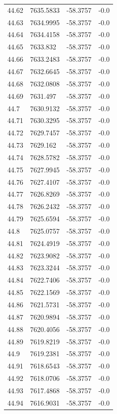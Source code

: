\begin{table}[H]
\begin{tabular}{llll}
44.62 & 7635.5833 & -58.3757 & -0.0 \\
44.63 & 7634.9995 & -58.3757 & -0.0 \\
44.64 & 7634.4158 & -58.3757 & -0.0 \\
44.65 & 7633.832 & -58.3757 & -0.0 \\
44.66 & 7633.2483 & -58.3757 & -0.0 \\
44.67 & 7632.6645 & -58.3757 & -0.0 \\
44.68 & 7632.0808 & -58.3757 & -0.0 \\
44.69 & 7631.497 & -58.3757 & -0.0 \\
44.7 & 7630.9132 & -58.3757 & -0.0 \\
44.71 & 7630.3295 & -58.3757 & -0.0 \\
44.72 & 7629.7457 & -58.3757 & -0.0 \\
44.73 & 7629.162 & -58.3757 & -0.0 \\
44.74 & 7628.5782 & -58.3757 & -0.0 \\
44.75 & 7627.9945 & -58.3757 & -0.0 \\
44.76 & 7627.4107 & -58.3757 & -0.0 \\
44.77 & 7626.8269 & -58.3757 & -0.0 \\
44.78 & 7626.2432 & -58.3757 & -0.0 \\
44.79 & 7625.6594 & -58.3757 & -0.0 \\
44.8 & 7625.0757 & -58.3757 & -0.0 \\
44.81 & 7624.4919 & -58.3757 & -0.0 \\
44.82 & 7623.9082 & -58.3757 & -0.0 \\
44.83 & 7623.3244 & -58.3757 & -0.0 \\
44.84 & 7622.7406 & -58.3757 & -0.0 \\
44.85 & 7622.1569 & -58.3757 & -0.0 \\
44.86 & 7621.5731 & -58.3757 & -0.0 \\
44.87 & 7620.9894 & -58.3757 & -0.0 \\
44.88 & 7620.4056 & -58.3757 & -0.0 \\
44.89 & 7619.8219 & -58.3757 & -0.0 \\
44.9 & 7619.2381 & -58.3757 & -0.0 \\
44.91 & 7618.6543 & -58.3757 & -0.0 \\
44.92 & 7618.0706 & -58.3757 & -0.0 \\
44.93 & 7617.4868 & -58.3757 & -0.0 \\
44.94 & 7616.9031 & -58.3757 & -0.0 \\

\end{tabular}
\end{table}
